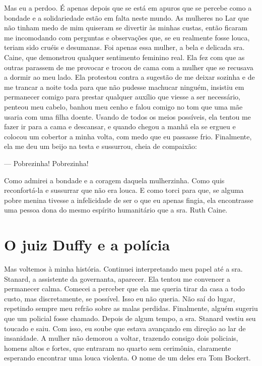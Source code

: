 Mas eu a perdoo. É apenas depois que se está em apuros que se percebe
como a bondade e a solidariedade estão em falta neste mundo. As mulheres
no Lar que não tinham medo de mim quiseram se divertir às minhas custas,
então ficaram me incomodando com perguntas e observações que, se eu
realmente fosse louca, teriam sido cruéis e desumanas. Foi apenas essa
mulher, a bela e delicada sra. Caine, que demonstrou qualquer sentimento
feminino real. Ela fez com que as outras parassem de me provocar e
trocou de cama com a mulher que se recusava a dormir ao meu lado. Ela
protestou contra a sugestão de me deixar sozinha e de me trancar a noite
toda para que não pudesse machucar ninguém, insistiu em permanecer
comigo para prestar qualquer auxílio que viesse a ser necessário,
penteou meu cabelo, banhou meu cenho e falou comigo no tom que uma mãe
usaria com uma filha doente. Usando de todos os meios possíveis, ela
tentou me fazer ir para a cama e descansar, e quando chegou a manhã ela
se ergueu e colocou um cobertor a minha volta, com medo que eu passasse
frio. Finalmente, ela me deu um beijo na testa e sussurrou, cheia de
compaixão:

--- Pobrezinha! Pobrezinha!

Como admirei a bondade e a coragem daquela mulherzinha. Como quis
reconfortá-la e sussurrar que não era louca. E como torci para que, se
alguma pobre menina tivesse a infelicidade de ser o que eu apenas
fingia, ela encontrasse uma pessoa dona do mesmo espírito humanitário
que a sra. Ruth Caine.



\chapter{O juiz Duffy e a polícia}\label{capuxedtulo-iv-o-juiz-duffy-e-a-poluxedcia}

Mas voltemos à minha história. Continuei interpretando meu papel até a
sra. Stanard, a assistente da governanta, aparecer. Ela tentou me
convencer a permanecer calma. Comecei a perceber que ela me queria tirar
da casa a todo custo, mas discretamente, se possível. Isso eu não
queria. Não saí do lugar, repetindo sempre meu refrão sobre as malas
perdidas. Finalmente, alguém sugeriu que um policial fosse chamado.
Depois de algum tempo, a sra. Stanard vestiu seu toucado e saiu. Com
isso, eu soube que estava avançando em direção ao lar de insanidade. A
mulher não demorou a voltar, trazendo consigo dois policiais, homens
altos e fortes, que entraram no quarto sem cerimônia, claramente
esperando encontrar uma louca violenta. O nome de um deles era Tom
Bockert.

